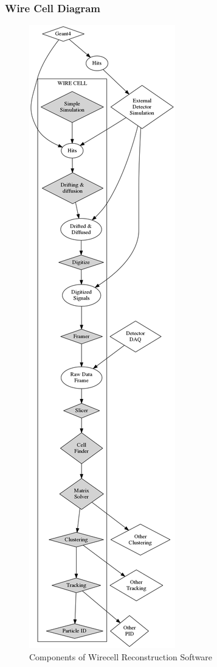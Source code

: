 \subsubsection{Wire Cell Diagram}
\label{sec:wc-diagram}
\begin{figure}[h!]
	\centering
	\includegraphics[height=0.8\textheight]{wirecell-dataflow-conceptual.png}
	\caption{Components of Wirecell Reconstruction Software}
	\label{fig:wirecell-diagram}
\end{figure}


\newpage
